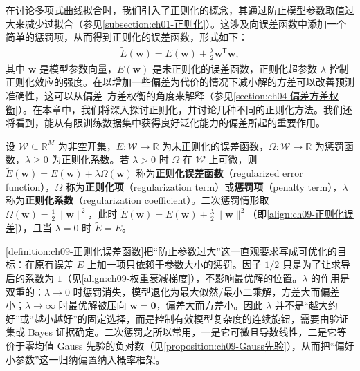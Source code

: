 \documentclass[../../main.tex]{subfiles}
\begin{document}
在讨论多项式曲线拟合时，我们引入了正则化的概念，其通过防止模型参数取值过大来减少过拟合（参见\cref{subsection:ch01-正则化}）。这涉及向误差函数中添加一个简单的惩罚项，从而得到正则化的误差函数，形式如下：
\begin{align}
\widetilde{E}(\boldsymbol{w}) = E(\boldsymbol{w}) + \frac{\lambda}{2}\boldsymbol{w}^{\mathsf T}\boldsymbol{w},
\label{align:ch09-正则化误差}
\end{align}
其中 $\boldsymbol{w}$ 是模型参数向量，$E(\boldsymbol{w})$ 是未正则化的误差函数，正则化超参数 $\lambda$ 控制正则化效应的强度。在以增加一些偏差为代价的情况下减小解的方差可以改善预测准确性，这可以从偏差--方差权衡的角度来解释（参见\cref{section:ch04-偏差方差权衡}）。在本章中，我们将深入探讨正则化，并讨论几种不同的正则化方法。我们还将看到，能从有限训练数据集中获得良好泛化能力的偏差所起的重要作用。

\begin{definition}[正则化误差函数]\label{definition:ch09-正则化误差函数}
设 $\mathcal{W}\subseteq\mathbb{R}^{M}$ 为非空开集，$E:\mathcal{W}\to\mathbb{R}$ 为未正则化的误差函数，$\Omega:\mathcal{W}\to\mathbb{R}$ 为惩罚函数，$\lambda\geqslant0$ 为正则化系数。若 $\lambda>0$ 时 $\Omega$ 在 $\mathcal{W}$ 上可微，则 $\widetilde{E}(\boldsymbol{w})=E(\boldsymbol{w})+\lambda\Omega(\boldsymbol{w})$ 称为\textbf{正则化误差函数}（regularized error function），$\Omega$ 称为\textbf{正则化项}（regularization term）或\textbf{惩罚项}（penalty term），$\lambda$ 称为\textbf{正则化系数}（regularization coefficient）。二次惩罚情形取 $\Omega(\boldsymbol{w})=\frac{1}{2}\|\boldsymbol{w}\|^{2}$，此时
$\widetilde{E}(\boldsymbol{w})=E(\boldsymbol{w})+\frac{\lambda}{2}\|\boldsymbol{w}\|^{2}$（即\eqref{align:ch09-正则化误差}），且当 $\lambda=0$ 时 $\widetilde{E}=E$。
\end{definition}

\begin{remark}\cref{definition:ch09-正则化误差函数}把“防止参数过大”这一直观要求写成可优化的目标：在原有误差 $E$ 上加一项只依赖于参数大小的惩罚。因子 $1/2$ 只是为了让求导后的系数为 $1$（见\cref{align:ch09-权重衰减梯度}），不影响最优解的位置。$\lambda$ 的作用是双重的：$\lambda\to0$ 时惩罚消失，模型退化为最大似然/最小二乘解，方差大而偏差小；$\lambda\to\infty$ 时最优解被压向 $\boldsymbol{w}=\boldsymbol{0}$，偏差大而方差小。因此 $\lambda$ 并不是“越大约好”或“越小越好”的固定选择，而是控制有效模型复杂度的连续旋钮，需要由验证集或 Bayes 证据确定。二次惩罚之所以常用，一是它可微且导数线性，二是它等价于零均值 Gauss 先验的负对数（见\cref{proposition:ch09-Gauss先验}），从而把“偏好小参数”这一归纳偏置纳入概率框架。
\end{remark}
\end{document}
